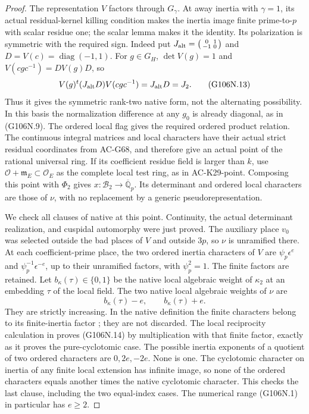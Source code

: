 \begin{proof}
The representation \(V\) factors through
\(G_\gamma\). At away inertia with \(\gamma=1\),
its actual residual-kernel killing condition makes the
inertia image finite prime-to-\(p\) with scalar residue
one; the scalar lemma makes it the identity.
Its polarization is symmetric with the required sign.
Indeed put
\(J_{\rm alt}=\left(\begin{smallmatrix}0&1\\-1&0\end{smallmatrix}\right)\)
and \(D=V(c)=\operatorname{diag}(-1,1)\).
For \(g\in G_H\), \(\det V(g)=1\) and
\(V(cgc^{-1})=DV(g)D\), so
\[
 V(g)^t(J_{\rm alt}D)V(cgc^{-1})=J_{\rm alt}D=J_2.
\tag{G106N.13}
\]
Thus it gives the symmetric rank-two native form, not
the alternating possibility. In this basis the
normalization difference at any \(g_0\) is already
diagonal, as in (G106N.9). The ordered local flag gives
the required ordered product relation. The continuous
integral matrices and local characters have their actual
strict residual coordinates from AC-G68, and therefore
give an actual point of the rational universal ring.
If its coefficient residue field is larger than \(k\),
use \(\mathcal O+\mathfrak m_E\subset\mathcal O_E\)
as the complete local test ring, as in AC-K29-point.
Composing this point with \(\Phi_2\) gives
\(x:\mathscr B_2\to\overline{\mathbb Q}_p\).
Its determinant and ordered local characters are those
of \(\nu\), with no replacement by a generic
pseudorepresentation.

We check all clauses of native  at this point.
Continuity, the actual determinant realization, and
cuspidal automorphy were just proved. The auxiliary
place \(v_0\) was selected outside the bad places of
\(V\) and outside \(3p\), so \(\nu\) is unramified
there. At each coefficient-prime place, the two ordered
inertia characters of \(V\) are
\(\psi_p\epsilon^e\) and
\(\psi_p^{-1}\epsilon^{-e}\), up to their unramified
factors, with \(\psi_p^2=1\). The finite factors are
retained. Let \(b_\kappa(\tau)\in\{0,1\}\) be
the native local algebraic weight of \(\kappa_2\)
at an embedding \(\tau\) of the local field.
The two native local algebraic weights of \(\nu\) are
\[
                b_\kappa(\tau)-e,
                \qquad b_\kappa(\tau)+e.
\tag{G106N.14}
\]
They are strictly increasing. In the native
 definition the finite characters belong
to its finite-inertia factor ; they are not
discarded. The local reciprocity calculation in
proves (G106N.14) by multiplication with that finite
factor, exactly as it proves the pure-cyclotomic case.
The possible inertia exponents of a quotient of two
ordered characters are \(0,2e,-2e\). None is one.
The cyclotomic character on inertia of any finite local
extension has infinite image, so none of the ordered
characters equals another times the native cyclotomic
character. This checks the last  clause,
including the two equal-index cases. The numerical
range (G106N.1) in particular has \(e\ge2\).


\end{proof}
